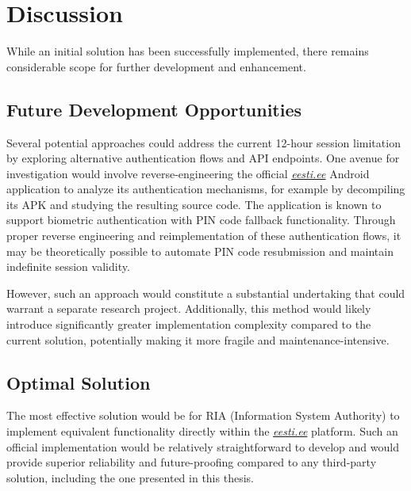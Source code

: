 \section{Discussion}

While an initial solution has been successfully implemented, there remains considerable scope for further development and enhancement.

\subsection{Future Development Opportunities}

Several potential approaches could address the current 12-hour session limitation by exploring alternative authentication flows and API endpoints. One avenue for investigation would involve reverse-engineering the official \textit{\href{https://www.eesti.ee}{eesti.ee}} Android application to analyze its authentication mechanisms, for example by decompiling its APK and studying the resulting source code. The application is known to support biometric authentication with PIN code fallback functionality. Through proper reverse engineering and reimplementation of these authentication flows, it may be theoretically possible to automate PIN code resubmission and maintain indefinite session validity.

However, such an approach would constitute a substantial undertaking that could warrant a separate research project. Additionally, this method would likely introduce significantly greater implementation complexity compared to the current solution, potentially making it more fragile and maintenance-intensive.

\subsection{Optimal Solution}

The most effective solution would be for RIA (Information System Authority) to implement equivalent functionality directly within the \textit{\href{https://www.eesti.ee}{eesti.ee}} platform. Such an official implementation would be relatively straightforward to develop and would provide superior reliability and future-proofing compared to any third-party solution, including the one presented in this thesis.